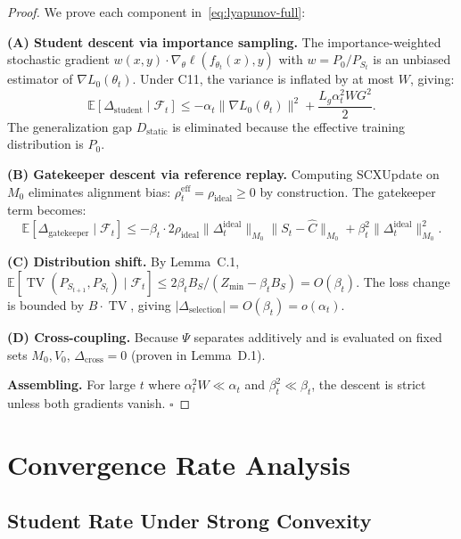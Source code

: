 \documentclass[11pt,a4paper]{article}
\theoremstyle{plain}
\theoremstyle{definition}
\theoremstyle{remark}
\DeclareMathOperator{\TV}{TV}
\newcommand{\E}{\mathbb{E}}
\newcommand{\F}{\mathcal{F}}
\begin{document}
\begin{proof}
    We prove each component in~\eqref{eq:lyapunov-full}:

    \textbf{(A) Student descent via importance sampling.} The importance-weighted stochastic gradient $w(x,y) \cdot \nabla_\theta \ell(f_{\theta_t}(x), y)$ with $w = P_0/P_{S_t}$ is an unbiased estimator of $\nabla L_0(\theta_t)$. Under C11, the variance is inflated by at most $W$, giving:
    \begin{equation}
        \E[\Delta_{\text{student}} \mid \F_t] \leq -\alpha_t \|\nabla L_0(\theta_t)\|^2 + \frac{L_g \alpha_t^2 W G^2}{2}.
    \end{equation}
    The generalization gap $D_{\text{static}}$ is eliminated because the effective training distribution is $P_0$.

    \textbf{(B) Gatekeeper descent via reference replay.} Computing SCXUpdate on $M_0$ eliminates alignment bias: $\rho_t^{\text{eff}} = \rho_{\text{ideal}} \geq 0$ by construction. The gatekeeper term becomes:
    \begin{equation}
        \E[\Delta_{\text{gatekeeper}} \mid \F_t] \leq -\beta_t \cdot 2\rho_{\text{ideal}} \|\Delta_t^{\text{ideal}}\|_{M_0} \|S_t - \hat{C}\|_{M_0} + \beta_t^2 \|\Delta_t^{\text{ideal}}\|_{M_0}^2.
    \end{equation}

    \textbf{(C) Distribution shift.} By Lemma~C.1, $\E[\TV(P_{S_{t+1}}, P_{S_t}) \mid \F_t] \leq 2\beta_t B_S / (Z_{\min} - \beta_t B_S) = O(\beta_t)$. The loss change is bounded by $B \cdot \TV$, giving $|\Delta_{\text{selection}}| = O(\beta_t) = o(\alpha_t)$.

    \textbf{(D) Cross-coupling.} Because $\Psi$ separates additively and is evaluated on fixed sets $M_0, V_0$, $\Delta_{\text{cross}} = 0$ (proven in Lemma~D.1).

    \textbf{Assembling.} For large $t$ where $\alpha_t^2 W \ll \alpha_t$ and $\beta_t^2 \ll \beta_t$, the descent is strict unless both gradients vanish. $\square$
\end{proof}

\section{Convergence Rate Analysis}

\subsection{Student Rate Under Strong Convexity}
\end{document}

